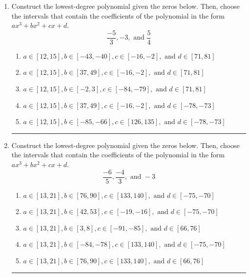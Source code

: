 \documentclass[14pt]{extbook}
\newcommand{\litem}[1]{\item#1\hspace*{-1cm}\rule{\textwidth}{0.4pt}}
\begin{document}
\begin{enumerate}
\litem{
Construct the lowest-degree polynomial given the zeros below. Then, choose the intervals that contain the coefficients of the polynomial in the form $ax^3+bx^2+cx+d$.\[ \frac{-5}{3}, -3, \text{ and } \frac{5}{4} \]\begin{enumerate}[label=\Alph*.]
\item \( a \in [12, 15], b \in [-43, -40], c \in [-16, -2], \text{ and } d \in [71, 81] \)
\item \( a \in [12, 15], b \in [37, 49], c \in [-16, -2], \text{ and } d \in [71, 81] \)
\item \( a \in [12, 15], b \in [-2, 3], c \in [-84, -79], \text{ and } d \in [71, 81] \)
\item \( a \in [12, 15], b \in [37, 49], c \in [-16, -2], \text{ and } d \in [-78, -73] \)
\item \( a \in [12, 15], b \in [-85, -66], c \in [126, 135], \text{ and } d \in [-78, -73] \)

\end{enumerate} }
\litem{
Construct the lowest-degree polynomial given the zeros below. Then, choose the intervals that contain the coefficients of the polynomial in the form $ax^3+bx^2+cx+d$.\[ \frac{-6}{5}, \frac{-4}{3}, \text{ and } -3 \]\begin{enumerate}[label=\Alph*.]
\item \( a \in [13, 21], b \in [76, 90], c \in [133, 140], \text{ and } d \in [-75, -70] \)
\item \( a \in [13, 21], b \in [42, 53], c \in [-19, -16], \text{ and } d \in [-75, -70] \)
\item \( a \in [13, 21], b \in [3, 8], c \in [-91, -85], \text{ and } d \in [66, 76] \)
\item \( a \in [13, 21], b \in [-84, -78], c \in [133, 140], \text{ and } d \in [-75, -70] \)
\item \( a \in [13, 21], b \in [76, 90], c \in [133, 140], \text{ and } d \in [66, 76] \)


\end{enumerate}}
\end{enumerate}
\end{document}
